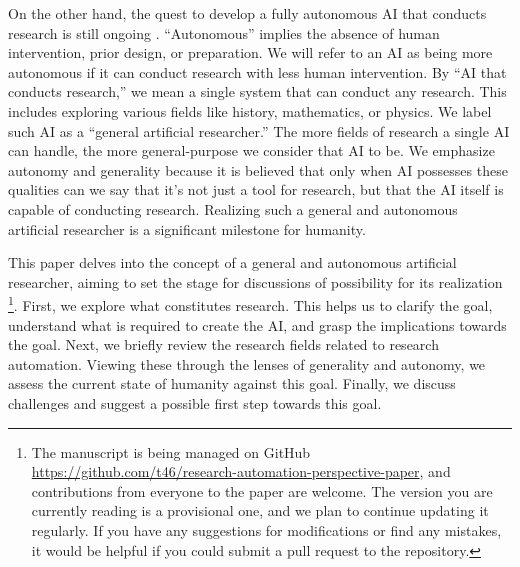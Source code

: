 On the other hand, the quest to develop a fully autonomous AI that conducts research is still ongoing \cite{zenil2023}. ``Autonomous'' implies the absence of human intervention, prior design, or preparation. We will refer to an AI as being more autonomous if it can conduct research with less human intervention. By ``AI that conducts research,'' we mean a single system that can conduct any research. This includes exploring various fields like history, mathematics, or physics. We label such AI as a ``general artificial researcher.'' The more fields of research a single AI can handle, the more general-purpose we consider that AI to be. 
We emphasize autonomy and generality because it is believed that only when AI possesses these qualities can we say that it's not just a tool for research, but that the AI itself is capable of conducting research. Realizing such a general and autonomous artificial researcher is a significant milestone for humanity.

This paper delves into the concept of a general and autonomous artificial researcher, aiming to set the stage for discussions of possibility for its realization \footnote{
The manuscript is being managed on GitHub \url{https://github.com/t46/research-automation-perspective-paper}, and contributions from everyone to the paper are welcome. The version you are currently reading is a provisional one, and we plan to continue updating it regularly. If you have any suggestions for modifications or find any mistakes, it would be helpful if you could submit a pull request to the repository.
}. 
First, we explore what constitutes research. This helps us to clarify the goal, understand what is required to create the AI, and grasp the implications towards the goal. Next, we briefly review the research fields related to research automation. Viewing these through the lenses of generality and autonomy, we assess the current state of humanity against this goal. Finally, we discuss challenges and suggest a possible first step towards this goal.


